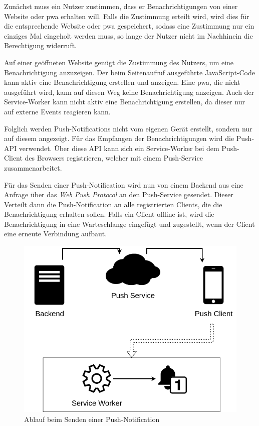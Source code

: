 \documentclass[12pt, parskip=half]{scrartcl}       %
\begin{document}
Zunächst muss ein Nutzer zustimmen, dass er Benachrichtigungen von einer Website oder \ac{pwa} erhalten will.
Falls die Zustimmung erteilt wird, wird dies für die entsprechende Website oder \ac{pwa} gespeichert, sodass eine Zustimmung nur ein einziges Mal eingeholt werden muss, so lange der Nutzer nicht im Nachhinein die Berechtigung widerruft.

Auf einer geöffneten Website genügt die Zustimmung des Nutzers, um eine Benachrichtigung anzuzeigen.
Der beim Seitenaufruf ausgeführte JavaScript-Code kann aktiv eine Benachrichtigung erstellen und anzeigen.
Eine \ac{pwa}, die nicht ausgeführt wird, kann auf diesen Weg keine Benachrichtigung anzeigen.
Auch der Service-Worker kann nicht aktiv eine Benachrichtigung erstellen, da dieser nur auf externe Events reagieren kann.

Folglich werden Push-Notifications nicht vom eigenen Gerät erstellt, sondern nur auf diesem angezeigt.
Für das Empfangen der Benachrichtigungen wird die Push-API\cite{w3c_pushapi} verwendet.
Über diese API kann sich ein Service-Worker bei dem Push-Client des Browsers registrieren, welcher mit einem Push-Service zusammenarbeitet.



Für das Senden einer Push-Notification wird nun von einem Backend aus eine Anfrage über das \textit{Web Push Protocol}\cite{ietf_webpush} an den Push-Service gesendet.
Dieser Verteilt dann die Push-Notification an alle registrierten Clients, die die Benachrichtigung erhalten sollen.
Falls ein Client offline ist, wird die Benachrichtigung in eine Warteschlange eingefügt und zugestellt, wenn der Client eine erneute Verbindung aufbaut\cite{googledev_webpush}.

\begin{figure}[h]
  \centering
  \includegraphics[width=\textwidth]{src/Push-API.png}
  \caption{Ablauf beim Senden einer Push-Notification}
  \label{fig:push_api}
\end{figure}
\end{document}
